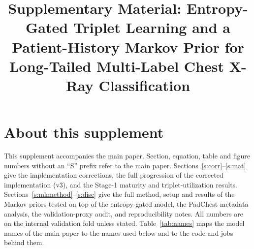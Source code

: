 \documentclass[conference]{IEEEtran}
\begin{document}
\title{Supplementary Material: Entropy-Gated Triplet Learning and a Patient-History Markov Prior for Long-Tailed Multi-Label Chest X-Ray Classification}

\author{
\and
{}
\and
{}
\and
{}
\and
{}
}

\maketitle

\renewcommand{\thesection}{S\arabic{section}}
\renewcommand{\thetable}{S\arabic{table}}
\renewcommand{\thefigure}{S\arabic{figure}}
\renewcommand{\theequation}{S\arabic{equation}}
\section*{About this supplement}
This supplement accompanies the main paper. Section, equation, table and figure numbers without an ``S'' prefix refer to the main paper. Sections~\ref{s:corr}--\ref{s:mat} give the implementation corrections, the full progression of the corrected implementation (v3), and the Stage-1 maturity and triplet-utilization results. Sections~\ref{s:mkmethod}--\ref{s:disc} give the full method, setup and results of the Markov priors tested on top of the entropy-gated model, the PadChest metadata analysis, the validation-proxy audit, and reproducibility notes. All numbers are on the internal validation fold unless stated. Table~\ref{tab:names} maps the model names of the main paper to the names used below and to the code and jobs behind them.
\end{document}
